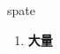 
\begin{frame}
{\huge spate}
\begin{center}
\begin{enumerate}\Large
  \item \textbf{大量}
\end{enumerate}
\end{center}
\end{frame}
